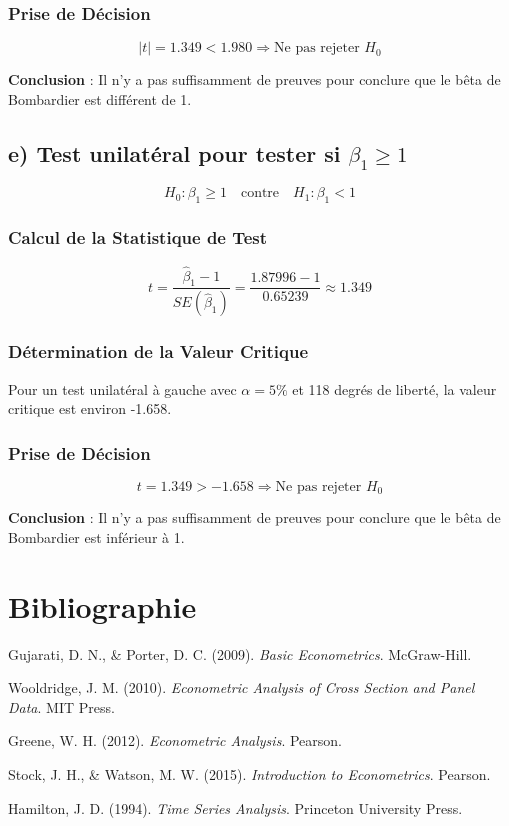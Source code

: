 \documentclass[14pt]{extarticle} %
\theoremstyle{definition}
\theoremstyle{plain}
\begin{document}
\subsubsection*{Prise de Décision}
\[
|t| = 1.349 < 1.980 \Rightarrow \text{Ne pas rejeter } H_0
\]

\textbf{Conclusion} : Il n'y a pas suffisamment de preuves pour conclure que le bêta de Bombardier est différent de 1.

\subsection*{e) Test unilatéral pour tester si \(\beta_1 \geq 1\)}
\[
H_0 : \beta_1 \geq 1 \quad \text{contre} \quad H_1 : \beta_1 < 1
\]

\subsubsection*{Calcul de la Statistique de Test}
\[
t = \frac{\hat{\beta}_1 - 1}{SE(\hat{\beta}_1)} = \frac{1.87996 - 1}{0.65239} \approx 1.349
\]

\subsubsection*{Détermination de la Valeur Critique}
Pour un test unilatéral à gauche avec \(\alpha = 5\%\) et 118 degrés de liberté, la valeur critique est environ -1.658.

\subsubsection*{Prise de Décision}
\[
t = 1.349 > -1.658 \Rightarrow \text{Ne pas rejeter } H_0
\]

\textbf{Conclusion} : Il n'y a pas suffisamment de preuves pour conclure que le bêta de Bombardier est inférieur à 1.

\section*{Bibliographie}

\begin{thebibliography}{9}

Gujarati, D. N., \& Porter, D. C. (2009). \textit{Basic Econometrics}. McGraw-Hill.
  
Wooldridge, J. M. (2010). \textit{Econometric Analysis of Cross Section and Panel Data}. MIT Press.
  
Greene, W. H. (2012). \textit{Econometric Analysis}. Pearson.

Stock, J. H., \& Watson, M. W. (2015). \textit{Introduction to Econometrics}. Pearson.
  
Hamilton, J. D. (1994). \textit{Time Series Analysis}. Princeton University Press.
  
\end{thebibliography}
\end{document}
